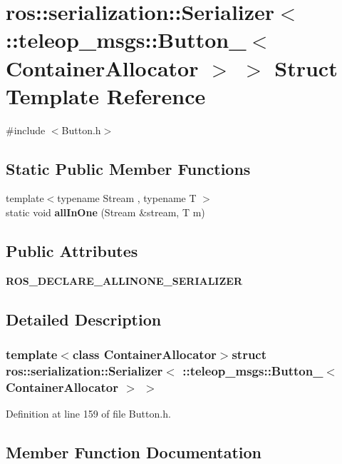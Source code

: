 \section{ros::serialization::Serializer$<$ ::teleop\_\-msgs::Button\_\-$<$ ContainerAllocator $>$ $>$ Struct Template Reference}
\label{structros_1_1serialization_1_1Serializer_3_01_1_1teleop__msgs_1_1Button___3_01ContainerAllocator_01_4_01_4}


{\ttfamily \#include $<$Button.h$>$}

\subsection*{Static Public Member Functions}
\begin{DoxyCompactItemize}
\item 
{\footnotesize template$<$typename Stream , typename T $>$ }\\static void {\bf allInOne} (Stream \&stream, T m)
\end{DoxyCompactItemize}
\subsection*{Public Attributes}
\begin{DoxyCompactItemize}
\item 
{\bf ROS\_\-DECLARE\_\-ALLINONE\_\-SERIALIZER}
\end{DoxyCompactItemize}


\subsection{Detailed Description}
\subsubsection*{template$<$class ContainerAllocator$>$struct ros::serialization::Serializer$<$ ::teleop\_\-msgs::Button\_\-$<$ ContainerAllocator $>$ $>$}



Definition at line 159 of file Button.h.



\subsection{Member Function Documentation}
